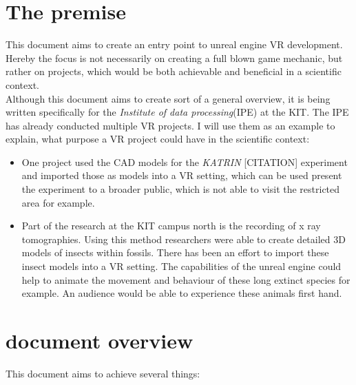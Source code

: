 \section{The premise}

This document aims to create an entry point to unreal engine VR development. Hereby the focus is not necessarily on creating a full blown game mechanic, but rather on projects, which would be both achievable and beneficial in a scientific context.\\
Although this document aims to create sort of a general overview, it is being written specifically for the \textit{Institute of data processing}(IPE) at the KIT. The IPE has already conducted multiple VR projects. I will use them as an example to explain, what purpose a VR project could have in the scientific context:

\begin{itemize}
\item One project used the CAD models for the \textit{KATRIN} [CITATION] experiment and imported those as models into a VR setting, which can be used present the experiment to a broader public, which is not able to visit the restricted area for example.
\item Part of the research at the KIT campus north is the recording of x ray tomographies. Using this method researchers were able to create detailed 3D models of insects within fossils. There has been an effort to import these insect models into a VR setting. The capabilities of the unreal engine could help to animate the movement and behaviour of these long extinct species for example. An audience would be able to experience these animals first hand.
\end{itemize}

\section{document overview}

This document aims to achieve several things:

